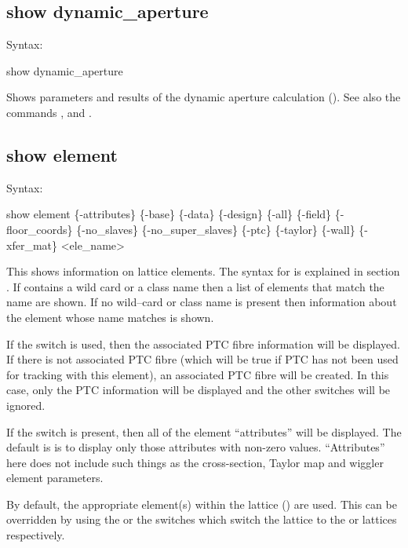 {{{{{{{{\subsection{show dynamic_aperture}
\label{s:show.da}

Syntax:
\begin{example}
  show dynamic_aperture
\end{example}

Shows parameters and results of the dynamic aperture calculation ().
See also the commands , and .


\subsection{show element}
\label{s:show.element}

Syntax:
\begin{example}
  show element \{-attributes\} \{-base\} \{-data\} \{-design\} \{-all\} \{-field\}
      \{-floor_coords\} \{-no_slaves\} \{-no_super_slaves\} \{-ptc\} \{-taylor\} \{-wall\} 
      \{-xfer_mat\} <ele_name>
\end{example}

This shows information on lattice elements. The syntax for  is explained in section
. If  contains a wild card or a class name then a list of
elements that match the name are shown. If no wild--card or class name is present then information
about the element whose name matches  is shown.

If the  switch is used, then the associated PTC fibre information will be displayed. If
there is not associated PTC fibre (which will be true if PTC has not been used for tracking with
this element), an associated PTC fibre will be created. In this case, only the PTC information will
be displayed and the other switches will be ignored.

If the  switch is present, then all of the element ``attributes'' will be
displayed. The default is is to display only those attributes with non-zero values. ``Attributes''
here does not include such things as the cross-section, Taylor map and wiggler element parameters.

By default, the appropriate element(s) within the  lattice () are
used. This can be overridden by using the  or the  switches which switch the
lattice to the  or  lattices respectively.

}}}}}}}}
